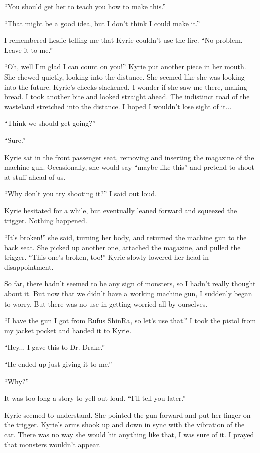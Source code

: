 \documentclass[oneside]{book}
\begin{document}
“You should get her to teach you how to make this.”

“That might be a good idea, but I don’t think I could make it.”

I remembered Leslie telling me that Kyrie couldn’t use the fire. “No problem. Leave it to me.”

“Oh, well I’m glad I can count on you!” Kyrie put another piece in her mouth. She chewed quietly, looking into the distance. She seemed like she was looking into the future. Kyrie’s cheeks slackened. I wonder if she saw me there, making bread. I took another bite and looked straight ahead. The indistinct road of the wasteland stretched into the distance. I hoped I wouldn’t lose sight of it...

“Think we should get going?”

“Sure.”

Kyrie sat in the front passenger seat, removing and inserting the magazine of the machine gun. Occasionally, she would say “maybe like this” and pretend to shoot at stuff ahead of us.

“Why don’t you try shooting it?” I said out loud.

Kyrie hesitated for a while, but eventually leaned forward and squeezed the trigger. Nothing happened.

“It’s broken!” she said, turning her body, and returned the machine gun to the back seat. She picked up another one, attached the magazine, and pulled the trigger. “This one’s broken, too!” Kyrie slowly lowered her head in disappointment.

So far, there hadn’t seemed to be any sign of monsters, so I hadn’t really thought about it. But now that we didn’t have a working machine gun, I suddenly began to worry. But there was no use in getting worried all by ourselves.

“I have the gun I got from Rufus ShinRa, so let’s use that.” I took the pistol from my jacket pocket and handed it to Kyrie.

“Hey... I gave this to Dr. Drake.”

“He ended up just giving it to me.”

“Why?”

It was too long a story to yell out loud. “I’ll tell you later.”

Kyrie seemed to understand. She pointed the gun forward and put her finger on the trigger. Kyrie’s arms shook up and down in sync with the vibration of the car. There was no way she would hit anything like that, I was sure of it. I prayed that monsters wouldn’t appear.
\end{document}
